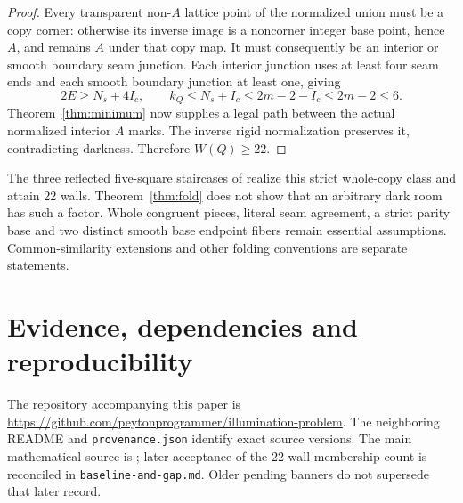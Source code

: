 \documentclass[11pt]{article}
\theoremstyle{definition}
\begin{document}
\begin{proof}
Every transparent non-$A$ lattice point of the normalized union must be a copy corner: otherwise its inverse image is a noncorner integer base point, hence $A$, and remains $A$ under that copy map. It must consequently be an interior or smooth boundary seam junction. Each interior junction uses at least four seam ends and each smooth boundary junction at least one, giving
\[
 2E\ge N_s+4I_c,\qquad
 k_Q\le N_s+I_c\le2m-2-I_c\le2m-2\le6.
\]
Theorem~\ref{thm:minimum} now supplies a legal path between the actual normalized interior $A$ marks. The inverse rigid normalization preserves it, contradicting darkness. Therefore $W(Q)\ge22$.
\end{proof}

The three reflected five-square staircases of \cite{construction} realize this strict whole-copy class and attain 22 walls. Theorem~\ref{thm:fold} does not show that an arbitrary dark room has such a factor. Whole congruent pieces, literal seam agreement, a strict parity base and two distinct smooth base endpoint fibers remain essential assumptions. Common-similarity extensions and other folding conventions are separate statements.

\section{Evidence, dependencies and reproducibility}\label{sec:records}
The repository accompanying this paper is
\url{https://github.com/peytonprogrammer/illumination-problem}. The neighboring README and \texttt{provenance.json} identify exact source versions. The main mathematical source is ; later acceptance of the 22-wall membership count is reconciled in \texttt{baseline-and-gap.md}. Older pending banners do not supersede that later record.
\end{document}
